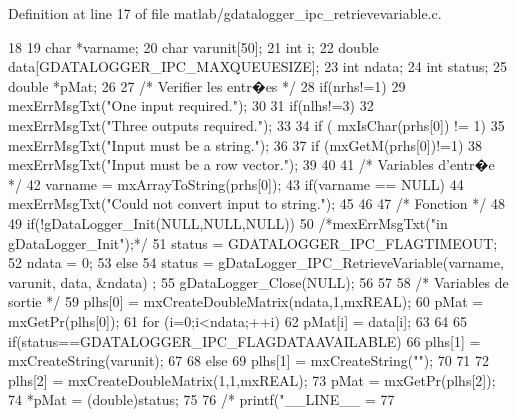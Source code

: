 Definition at line 17 of file matlab/gdatalogger\_\-ipc\_\-retrievevariable.c.


\begin{DoxyCode}
18 {
19         char  *varname;
20         char  varunit[50];
21         int       i;
22         double data[GDATALOGGER_IPC_MAXQUEUESIZE];
23         int ndata;
24     int status;
25         double *pMat;
26 
27         /* Verifier les entr�es */
28         if(nrhs!=1){
29                 mexErrMsgTxt("One input required.");
30                 }
31         if(nlhs!=3){
32                 mexErrMsgTxt("Three outputs required.");
33                 }
34     if ( mxIsChar(prhs[0]) != 1){
35       mexErrMsgTxt("Input must be a string.");
36         }
37     if (mxGetM(prhs[0])!=1){
38       mexErrMsgTxt("Input must be a row vector.");
39         }
40                 
41         /* Variables d'entr�e */
42     varname = mxArrayToString(prhs[0]);
43     if(varname == NULL) {
44       mexErrMsgTxt("Could not convert input to string.");
45         }
46 
47         /* Fonction */
48 
49         if(!gDataLogger_Init(NULL,NULL,NULL)){
50                 /*mexErrMsgTxt("\nError in gDataLogger_Init\n\n");*/
51         status = GDATALOGGER_IPC_FLAGTIMEOUT;
52         ndata = 0;
53         } else{
54         status = gDataLogger_IPC_RetrieveVariable(varname, varunit, data, &ndata)
      ;
55         gDataLogger_Close(NULL);
56     }
57     
58         /* Variables de sortie */
59         plhs[0] = mxCreateDoubleMatrix(ndata,1,mxREAL);
60         pMat = mxGetPr(plhs[0]);
61         for (i=0;i<ndata;++i){
62                 pMat[i] = data[i];
63         }
64     
65     if(status==GDATALOGGER_IPC_FLAGDATAAVAILABLE){
66         plhs[1] = mxCreateString(varunit);
67     }
68     else{
69         plhs[1] = mxCreateString("");
70     }
71     
72     plhs[2] = mxCreateDoubleMatrix(1,1,mxREAL);
73         pMat = mxGetPr(plhs[2]);
74     *pMat = (double)status;
75     
76 /*    printf("__LINE__ = %
77 }
\end{DoxyCode}
